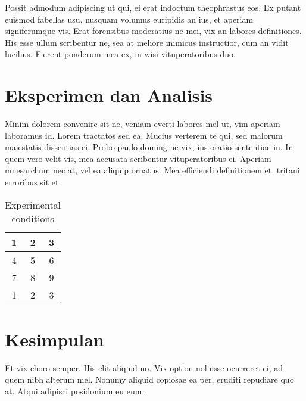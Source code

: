 \documentclass[review,3p,12pt]{elsarticle}
\begin{document}
Possit admodum adipiscing ut qui, ei erat indoctum theophrastus eos. Ex putant euismod fabellas usu, nusquam volumus euripidis an ius, et aperiam signiferumque vis. Erat forensibus moderatius ne mei, vix an labores definitiones. His esse ullum scribentur ne, sea at meliore inimicus instructior, cum an vidit lucilius. Fierent ponderum mea ex, in wisi vituperatoribus duo.


\section{Eksperimen dan Analisis}
\label{experiment}

Minim dolorem convenire sit ne, veniam everti labores mel ut, vim aperiam laboramus id. Lorem tractatos sed ea. Mucius verterem te qui, sed malorum maiestatis dissentias ei. Probo paulo doming ne vix, ius oratio sententiae in. In quem vero velit vis, mea accusata scribentur vituperatoribus ei. Aperiam mnesarchum nec at, vel ea aliquip ornatus. Mea efficiendi definitionem et, tritani erroribus sit et.

\begin{table}[htbp]
  \centering
  \caption{Experimental conditions}
  \label{tab:expcond}
  \begin{tabular}{ccc}
    \hline
    1 & 2 & 3 \\
    \hline
    4 & 5 & 6 \\
    7 & 8 & 9 \\
    1 & 2 & 3
\end{tabular}
\end{table}


\section{Kesimpulan}
\label{conclusion}

Et vix choro semper. His elit aliquid no. Vix option noluisse ocurreret ei, ad quem nibh alterum mel. Nonumy aliquid copiosae ea per, eruditi repudiare quo at. Atqui adipisci posidonium eu eum.



\end{document}
